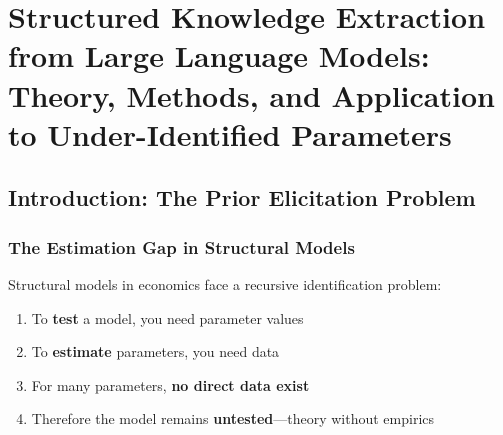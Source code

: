 \section{Structured Knowledge Extraction from Large Language Models: Theory, Methods, and Application to Under-Identified Parameters}
\label{app:llm-monte-carlo}


\begin{abstract}
This appendix develops a systematic methodology for extracting quantitative parameter estimates from Large Language Models (LLMs). Building on recent work showing that LLMs can provide informative Bayesian priors \citep{zhu2024eliciting, llmpriors2025scientific, nafar2025extracting}, we extend the approach to under-identified parameters in structural economic models. We contribute: (1) a theoretical framework interpreting LLMs as compressed representations of scientific consensus, (2) three distinct extraction methods with validation protocols, (3) a Bayesian integration procedure for combining LLM priors with empirical data, and (4) a practical demonstration estimating 48 context-welfare interaction coefficients. The methodology addresses a fundamental problem in structural modeling: the gap between theoretical frameworks predicting heterogeneous effects and empirical capacity to estimate context-dependent parameters.
\end{abstract}

\subsection{Introduction: The Prior Elicitation Problem}

\subsubsection{The Estimation Gap in Structural Models}

Structural models in economics face a recursive identification problem:

\begin{enumerate}
    \item To \textbf{test} a model, you need parameter values
    \item To \textbf{estimate} parameters, you need data
    \item For many parameters, \textbf{no direct data exist}
    \item Therefore the model remains \textbf{untested}---theory without empirics
\end{enumerate}

